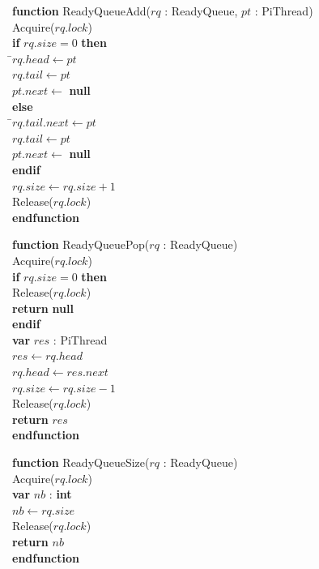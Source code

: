 \documentclass[a4paper,11pt]{article}
\newenvironment{program}{
  \begin{sffamily}
  \begin{scriptsize}
  \begin{tabbing}}
 {\end{tabbing}
  \end{scriptsize}
  \end{sffamily}}
\newcommand{\kw}[1]{\textsf{\textbf{#1}}}
\newcommand{\pindent}{\hspace{2em}\=}
\newcommand{\synchro}[1]{\textcolor{synchrocolor}{#1}}
\begin{document}
\label{ReadyQueueAdd}
\begin{program}
  \kw{function} ReadyQueueAdd($rq$ : ReadyQueue, $pt$ : PiThread) \\
  \pindent\synchro{Acquire($rq.lock$)} \\
  \>\kw{if} $rq.size = 0$ \kw{then} \\
  \>\pindent$rq.head \leftarrow pt$ \\
  \>\>$rq.tail \leftarrow pt$ \\
  \>\>$pt.next \leftarrow$ \kw{null} \\
  \>\kw{else} \\
  \>\pindent$rq.tail.next \leftarrow pt$ \\
  \>\>$rq.tail \leftarrow pt$ \\
  \>\>$pt.next \leftarrow$ \kw{null} \\
  \>\kw{endif} \\
  \>$rq.size \leftarrow rq.size + 1$ \\
  \>\synchro{Release($rq.lock$)} \\
  \kw{endfunction}
\end{program}

\label{ReadyQueuePop}
\begin{program}
  \kw{function} ReadyQueuePop($rq$ : ReadyQueue) \\
  \pindent\synchro{Acquire($rq.lock$)} \\
  \>\kw{if} $rq.size = 0$ \kw{then} \\
  \>\pindent\synchro{Release($rq.lock$)} \\
  \>\>\kw{return} \kw{null} \\
  \>\kw{endif} \\
  \>\kw{var} $res$ : PiThread \\
  \>$res \leftarrow rq.head$ \\
  \>$rq.head \leftarrow res.next$ \\
  \>$rq.size \leftarrow rq.size - 1$ \\
  \>\synchro{Release($rq.lock$)} \\
  \>\kw{return} $res$ \\
  \kw{endfunction}
\end{program}

\label{ReadyQueueSize}
\begin{program}
  \kw{function} ReadyQueueSize($rq$ : ReadyQueue) \\
  \pindent\synchro{Acquire($rq.lock$)} \\
  \>\kw{var} $nb$ : \kw{int} \\
  \>$nb \leftarrow rq.size$ \\
  \>\synchro{Release($rq.lock$)} \\
  \>\kw{return} $nb$ \\
  \kw{endfunction}
\end{program}
\end{document}
